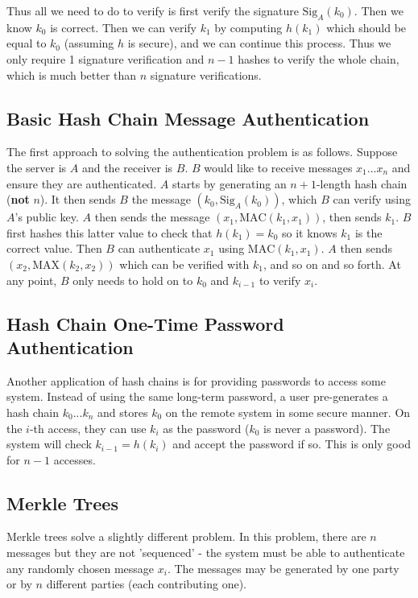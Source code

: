 \documentclass[11pt]{report}
\begin{document}
Thus all we need to do to verify is first verify the signature $\text{Sig}_{A}(k_0)$. Then we know $k_0$ is correct. Then we can verify $k_1$ by computing $h(k_1)$ which should be equal to $k_0$ (assuming $h$ is secure), and we can continue this process. Thus we only require 1 signature verification and $n-1$ hashes to verify the whole chain, which is much better than $n$ signature verifications.


\subsection{Basic Hash Chain Message Authentication}
The first approach to solving the authentication problem is as follows. Suppose the server is $A$ and the receiver is $B$. $B$ would like to receive messages $x_1 ... x_n$ and ensure they are authenticated. $A$ starts by generating an $n+1$-length hash chain (\textbf{not} $n$). It then sends $B$ the message $(k_0, \text{Sig}_{A}(k_0))$, which $B$ can verify using $A$'s public key. $A$ then sends the message $(x_1, \text{MAC}(k_1, x_1))$, then sends $k_1$. $B$ first hashes this latter value to check that $h(k_1) = k_0$ so it knows $k_1$ is the correct value. Then $B$ can authenticate $x_1$ using $\text{MAC}(k_1, x_1)$. $A$ then sends $(x_2, \text{MAX}(k_2, x_2))$ which can be verified with $k_1$, and so on and so forth. At any point, $B$ only needs to hold on to $k_0$ and $k_{i-1}$ to verify $x_i$.

\subsection{Hash Chain One-Time Password Authentication}
Another application of hash chains is for providing passwords to access some system. Instead of using the same long-term password, a user pre-generates a hash chain $k_0 ... k_n$ and stores $k_0$ on the remote system in some secure manner. On the $i$-th access, they can use $k_i$ as the password ($k_0$ is never a password). The system will check $k_{i-1} = h(k_i)$ and accept the password if so. This is only good for $n-1$ accesses.

\subsection{Merkle Trees}
Merkle trees solve a slightly different problem. In this problem, there are $n$ messages but they are not 'sequenced' - the system must be able to authenticate any randomly chosen message $x_i$. The messages may be generated by one party or by $n$ different parties (each contributing one). %
\end{document}
